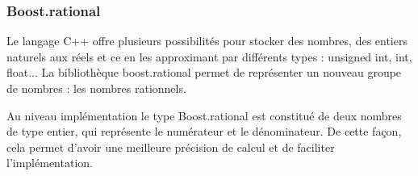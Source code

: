 
\subsubsection*{Boost.rational}

Le langage C++ offre plusieurs possibilités pour stocker des nombres, des entiers naturels aux réels et ce en les approximant par différents types : unsigned int, int, float... La bibliothèque boost.rational permet de représenter un nouveau groupe de nombres : les nombres rationnels.

Au niveau implémentation le type Boost.rational est constitué de deux nombres de type entier, qui représente le numérateur et le dénominateur. De cette façon, cela permet d'avoir une meilleure précision de calcul et de faciliter l'implémentation.


